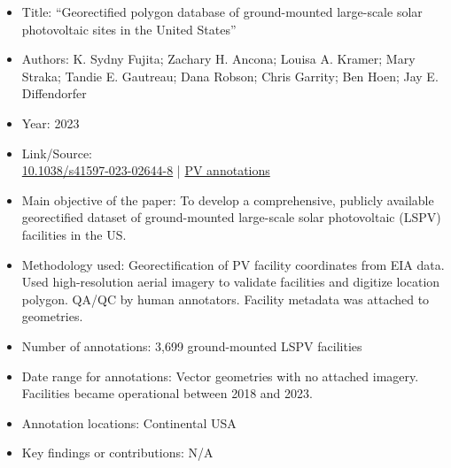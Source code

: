 \begin{itemize}
    \item Title: ``Georectified polygon database of ground-mounted large-scale solar photovoltaic sites in the United States''
    \item Authors: K. Sydny Fujita; Zachary H. Ancona; Louisa A. Kramer; Mary Straka; Tandie E. Gautreau; Dana Robson; Chris Garrity; Ben Hoen; Jay E. Diffendorfer 
    \item Year: 2023
    \item Link/Source: \\
    \href{https://doi.org/10.1038/s41597-023-02644-8}{10.1038/s41597-023-02644-8} | 
    \href{https://www.sciencebase.gov/catalog/item/6671c479d34e84915adb7536}{PV annotations} 
    \item Main objective of the paper: To develop a comprehensive, publicly available georectified dataset of ground-mounted 
    large-scale solar photovoltaic (LSPV) facilities in the US. 
    \item Methodology used: Georectification of PV facility coordinates from EIA data. 
    Used high-resolution aerial imagery to validate facilities and digitize location polygon. 
    QA/QC by human annotators. Facility metadata was attached to geometries. 
    \item Number of annotations: 3,699 ground-mounted LSPV facilities
    \item Date range for annotations: Vector geometries with no attached imagery. Facilities became operational between 2018 and 2023. 
    \item Annotation locations: Continental USA
    \item Key findings or contributions: N/A
\end{itemize}



